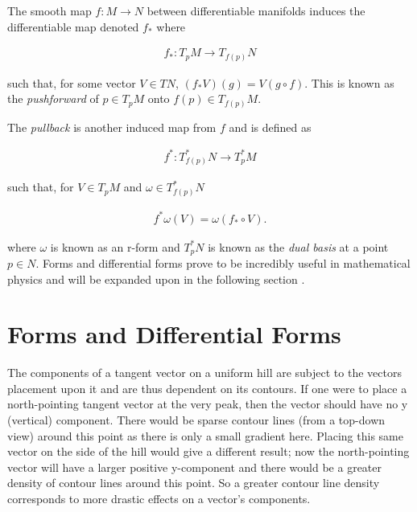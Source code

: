 \documentclass[fleqn, twocolumn, 10pt]{article}
\begin{document}
The smooth map $f: M \to N$ between differentiable manifolds induces the differentiable map denoted $f_\ast$ where

\begin{ceqn}
\begin{align*}
f_\ast: T_pM \to T_{f(p)}N
\end{align*}
\end{ceqn}
such that, for some vector $V \in TN$, $(f_\ast V)(g) = V(g \circ f)$. This is known as the \textit{pushforward} of $p \in T_pM$ onto $f(p) \in T_{f(p)}M$.

The \textit{pullback} is another induced map from $f$ and is defined as

\begin{ceqn}
\begin{align*}
f^\ast: T^\ast_{f(p)}N \to T^\ast_pM
\end{align*}
\end{ceqn}
such that, for $V \in T_pM$ and $\omega \in T^\ast_{f(p)}N$

\begin{ceqn}
\begin{align*}
f^\ast\omega(V) = \omega(f_\ast \circ V).
\end{align*}
\end{ceqn}
where $\omega$ is known as an r-form and $T^\ast_{p}N$ is known as the \textit{dual basis} at a point $p \in N$. Forms and differential forms prove to be incredibly useful in mathematical physics and will be expanded upon in the following section \cite{nakahara2003geometry, kobayashi1963foundations, kai2015lam}.


\section{Forms and Differential Forms}

The components of a tangent vector on a uniform hill are subject to the vectors placement upon it and are thus dependent on its contours. If one were to place a north-pointing tangent vector at the very peak, then the vector should have no y (vertical) component. There would be sparse contour lines (from a top-down view) around this point as there is only a small gradient here. Placing this same vector on the side of the hill would give a different result; now the north-pointing vector will have a larger positive y-component and there would be a greater density of contour lines around this point. So a greater contour line density corresponds to more drastic effects on a vector's components. 
\end{document}
